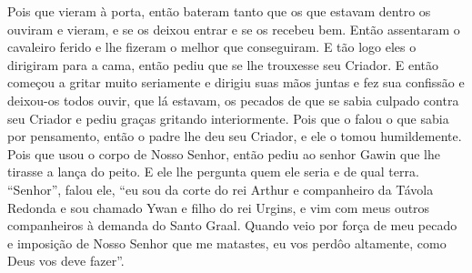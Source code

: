 Pois que vieram à porta, então bateram tanto que os que estavam dentro os
ouviram e vieram, e se os deixou entrar e se os recebeu bem. Então assentaram o
cavaleiro ferido e lhe fizeram o melhor que conseguiram. E tão logo eles o
dirigiram para a cama, então pediu que se lhe trouxesse seu Criador. E então
começou a gritar muito seriamente e dirigiu suas mãos juntas e fez sua
confissão e deixou-os todos ouvir, que lá estavam, os pecados de que se sabia
culpado contra seu Criador e pediu graças gritando interiormente. Pois que o
falou o que sabia por pensamento, então o padre lhe deu seu Criador, e ele o
tomou humildemente. Pois que usou o corpo de Nosso Senhor, então pediu ao
senhor Gawin que lhe tirasse a lança do peito. E ele lhe pergunta quem ele
seria e de qual terra. “Senhor”, falou ele, “eu sou da corte do rei Arthur e
companheiro da Távola Redonda e sou chamado Ywan e filho do rei Urgins, e vim
com meus outros companheiros à demanda do Santo Graal. Quando veio por força de
meu pecado e imposição de Nosso Senhor que me matastes, eu vos perdôo
altamente, como Deus vos deve fazer”.

